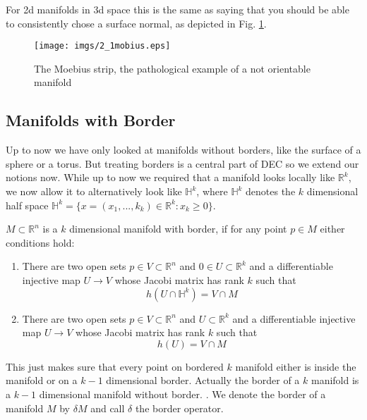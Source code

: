 For 2d manifolds in 3d space this is the same as saying that you should be able to consistently chose a surface normal, as depicted in Fig. \ref{fig::2_1_mobius}.

\begin{figure}[t]
\begin{center}
\texttt{[image: imgs/2\_1mobius.eps]}
\caption{The Moebius strip, the pathological example of a not orientable manifold}
\label{fig::2_1_mobius}
\end{center}
\end{figure}

\subsection{Manifolds with Border}
Up to now we have only looked at manifolds without borders, like the surface of a sphere or a torus. But treating borders is a central part of DEC so we extend our notions now. While up to now we required that a manifold looks locally like $\mathbb R^k$, we now allow it to alternatively look like $\mathbb H^k$, where $\mathbb H^k$ denotes the $k$ dimensional half space $\mathbb H^k = \{x = (x_1,...,k_k)\in \mathbb R^k: x_k \geq 0\}$.

\begin{definition} $M \subset \mathbb R^n$ is a $k$ dimensional manifold with border, if for any point $p \in M$ either conditions hold:
\begin{enumerate}
\item There are two open sets $p \in V\subset \mathbb R^n$ and $0\in U \subset \mathbb R^k$ and a differentiable injective map $U\to V$ whose Jacobi matrix has rank $k$ such that 
\[h(U\cap \mathbb H^k) =  V\cap M\]
\item  There are two open sets $p \in V\subset \mathbb R^n$ and $U \subset \mathbb R^k$ and a differentiable injective map $U\to V$ whose Jacobi matrix has rank $k$ such that 
\[h(U) =  V\cap M\]
\end{enumerate}
\end{definition}

 This just makes sure that every point on bordered $k$ manifold either is inside the manifold or on a $k-1$ dimensional border. Actually the border of a $k$ manifold is a $k-1$ dimensional manifold without border. .  We denote the border of a manifold $M$ by $\delta M$ and call $\delta$ the border operator.

